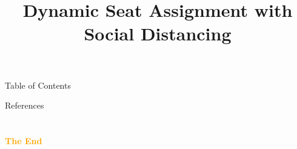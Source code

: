 \documentclass[aspectratio=43]{beamer}
\title{Dynamic Seat Assignment with Social Distancing} %
\subtitle{}
\institute[HKUST]{
    IEDA%
    \\%
    The Hong Kong University of Science and Technology%
} %
\date{}
\begin{document}
    \frame{\titlepage}
    \begin{frame}{Table of Contents}
        \tableofcontents
    \end{frame}
    
    
    
    
    
    
    
    \renewcommand*{\bibfont}{\scriptsize}
    \begin{frame}{References}
        \printbibliography
    \end{frame}

    \section{}
    \begin{frame}{}
        \centering
            \Huge\bfseries
        \textcolor{orange}{The End}
    \end{frame}
\end{document}
